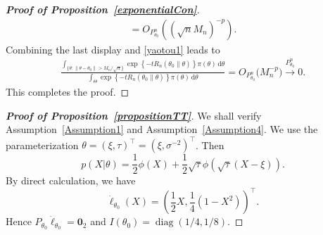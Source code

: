 \documentclass[11pt]{article}
\DeclareMathOperator{\mydiag}{diag}
\newcommand{\myT}{\intercal}
\theoremstyle{plain}
\theoremstyle{definition}
\theoremstyle{remark}
\begin{document}
\begin{appendices}
\begin{proof}[\textbf{Proof of Proposition~\ref{exponentialCon}}]
\begin{align*}
=O_{P^n_{\theta_0}}( (\sqrt n M_n)^{-p} ).
\end{align*}
Combining the last display and \eqref{yaotou1} leads to
$$
    \begin{aligned}
        \frac{
\int_{\{\theta:\|\theta-\theta_0\|> M_n/\sqrt{n}\}} \exp\left\{ -t R_n (\theta_0 \| \theta) \right\} \pi(\theta) \, \mathrm d \theta
        }
        {
\int_{\Theta} \exp\left\{ -t R_n (\theta_0 \| \theta) \right\} \pi(\theta) \, \mathrm d \theta
        }
        =
        O_{P_{\theta_0}^n}
        \Big(
            M_n^{-p}
        \Big)
        \xrightarrow{P^n_{\theta_0}} 0.
    \end{aligned}
$$
This completes the proof.

\end{proof}



\begin{proof}[\textbf{Proof of Proposition~\ref{propositionTT}}]
We shall verify Assumption~\ref{Assumption1} and Assumption~\ref{Assumption4}.
We use the parameterization
$
\theta=(\xi,\tau)^\myT  =(\xi,\sigma^{-2})^\myT $.
Then
\begin{equation*}
    p(X|\theta)=\frac{1}{2}\phi(X)+\frac{1}{2}\sqrt{\tau} \phi(\sqrt{\tau}(X-\xi)).
\end{equation*}
By direct calculation, we have 
\begin{equation*}
    \dot{\ell}_{\theta_0}(X)=\left(\frac{1}{2}X,\frac{1}{4}(1-X^2)\right)^\myT .
\end{equation*}
Hence $P_{\theta_0}\dot{\ell}_{\theta_0}=\mathbf{0}_2$ and
$I(\theta_0) = \mydiag (1/4, 1/8)$.


\end{proof}
\end{appendices}
\end{document}
